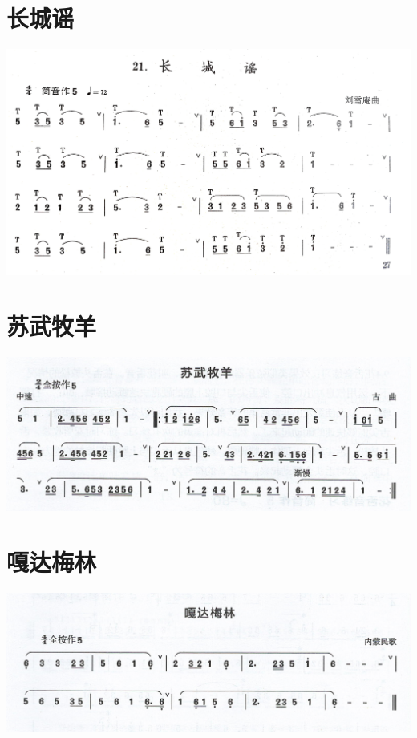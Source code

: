 \documentclass[cn,pad,chinese,chinesefont=nofont]{elegantbook}
\begin{document}
\section{长城谣}
	\includegraphics[width=\textwidth]{dongxiao/IMG_0934.jpg} 
\section{苏武牧羊}
	\includegraphics[width=\textwidth]{dongxiao/Scan 17-2.jpeg}
\section{嘎达梅林}
	\includegraphics[width=\textwidth]{dongxiao/Scan 17-3.jpeg}
      
\end{document}
